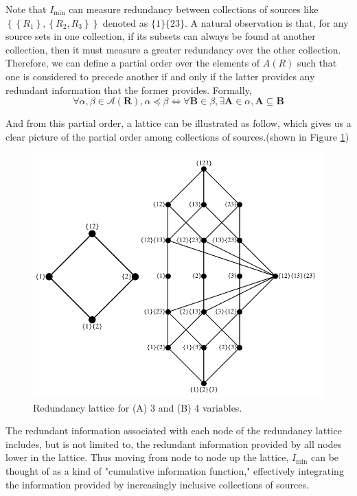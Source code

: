 Note that $I_{\min}$ can measure redundancy between collections of sources like $\left\{\left\{R_{1}\right\},\left\{R_{2}, R_{3}\right\}\right\}$ denoted as $\{1\}\{23\}$. A natural observation is that, for any source sets in one collection, if its subsets can always be found at another collection, then it must measure a greater redundancy over the other collection. Therefore, we can define a partial order over the elements of $A(R)$ such that one is considered to precede another if and only if the latter provides any redundant information that the former provides. Formally,
    \begin{equation}\forall \alpha, \beta \in \mathcal{A}(\mathbf{R}), \alpha \preccurlyeq \beta \Leftrightarrow \forall \mathbf{B} \in \beta, \exists \mathbf{A} \in \alpha, \mathbf{A} \subseteq \mathbf{B}\label{partialorder}\end{equation}

And from this partial order, a lattice can be illustrated as follow, which gives us a clear picture of the partial order among collections of sources.(shown in Figure \ref{fig:lattice})



\begin{figure}
            \centering
            \includegraphics[width=0.6\linewidth]{img/lattic.png}
            \caption{Redundancy lattice for (A) 3 and (B) 4 variables.}
            \label{fig:lattice}
        \end{figure}

The redundant information associated with each node of the redundancy lattice includes, but is not limited to, the redundant information provided by all nodes lower in the lattice. Thus moving from node to node up the lattice, $I_{\min }$ can be thought of as a kind of "cumulative information function," effectively integrating the information provided by increasingly inclusive collections of sources.

